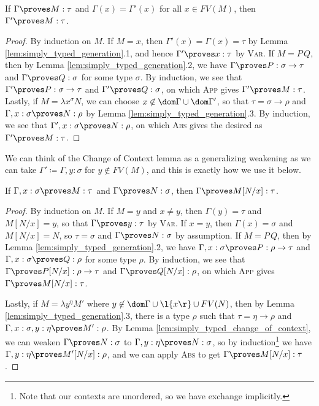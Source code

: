 \documentclass[reqno]{amsart}
\begin{document}
    \begin{lemma}\label{lem:simply_typed_change_of_context}
        If $\Gamma\proves M:\tau$ and $\Gamma(x)=\Gamma'(x)$ for all $x\in FV(M)$, then $\Gamma'\proves M:\tau$.
    \end{lemma}
    \begin{proof}
        By induction on $M$. If $M=x$, then $\Gamma'(x)=\Gamma(x)=\tau$ by Lemma \ref{lem:simply_typed_generation}.1, and hence $\Gamma'\proves x:\tau$ by \textsc{Var}. If $M=P\,Q$, then by Lemma \ref{lem:simply_typed_generation}.2, we have $\Gamma\proves P:\sigma\rightarrow\tau$ and $\Gamma\proves Q:\sigma$ for some type $\sigma$. By induction, we see that $\Gamma'\proves P:\sigma\to\tau$ and $\Gamma'\proves Q:\sigma$, on which \textsc{App} gives $\Gamma'\proves M:\tau$. Lastly, if $M=\lambda x^\sigma N$, we can choose $x\not\in\dom\Gamma\cup\dom\Gamma'$, so that $\tau=\sigma\rightarrow\rho$ and $\Gamma,x:\sigma\proves N:\rho$ by Lemma \ref{lem:simply_typed_generation}.3. By induction, we see that $\Gamma',x:\sigma\proves N:\rho$, on which \textsc{Abs} gives the desired as $\Gamma'\proves M:\tau$.
    \end{proof}

    We can think of the Change of Context lemma as a generalizing weakening as we can take $\Gamma'\coloneqq\Gamma,y:\sigma$ for $y\not\in FV(M)$, and this is exactly how we use it below.

    \begin{lemma}\label{lem:simply_typed_substitution}
        If $\Gamma,x:\sigma\proves M:\tau$ and $\Gamma\proves N:\sigma$, then $\Gamma\proves M[N/x]:\tau$.
    \end{lemma}
    \begin{proof}
        By induction on $M$. If $M=y$ and $x\neq y$, then $\Gamma(y)=\tau$ and $M[N/x]=y$, so that $\Gamma\proves y:\tau$ by \textsc{Var}. If $x=y$, then $\Gamma(x)=\sigma$ and $M[N/x]=N$, so $\tau=\sigma$ and $\Gamma\proves N:\sigma$ by assumption. If $M=P\,Q$, then by Lemma \ref{lem:simply_typed_generation}.2, we have $\Gamma,x:\sigma\proves P:\rho\rightarrow\tau$ and $\Gamma,x:\sigma\proves Q:\rho$ for some type $\rho$. By induction, we see that $\Gamma\proves P[N/x]:\rho\to\tau$ and $\Gamma\proves Q[N/x]:\rho$, on which \textsc{App} gives $\Gamma\proves M[N/x]:\tau$.

        Lastly, if $M=\lambda y^\eta M'$ where $y\not\in\dom\Gamma\cup\l\{x\r\}\cup FV(N)$, then by Lemma \ref{lem:simply_typed_generation}.3, there is a type $\rho$ such that $\tau=\eta\rightarrow\rho$ and $\Gamma,x:\sigma,y:\eta\proves M':\rho$. By Lemma \ref{lem:simply_typed_change_of_context}, we can weaken $\Gamma\proves N:\sigma$ to $\Gamma,y:\eta\proves N:\sigma$, so by induction\footnote{Note that our contexts are unordered, so we have exchange implicitly.} we have $\Gamma,y:\eta\proves M'[N/x]:\rho$, and we can apply \textsc{Abs} to get $\Gamma\proves M[N/x]:\tau$.
    \end{proof}
\end{document}
